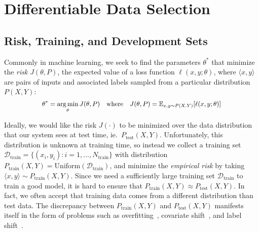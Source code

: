 \section{\label{sec:method} Differentiable Data Selection}

\subsection{\label{sec:dds_motivation}Risk, Training, and Development Sets}

Commonly in machine learning, we seek to find the parameters $\theta^*$ that minimize the \emph{risk} $J(\theta,P)$, the expected value of a loss function $\ell(x, y; \theta)$, where $\langle x, y \rangle$ are pairs of inputs and associated labels sampled from a particular distribution $P(X, Y)$:
\begin{equation}
  \label{eqn:generic_optim}
   \small
  \begin{aligned}
    \theta^* = \argmin_\theta J(\theta, P)
    ~~~\text{where}~~~
    J(\theta, P) = \mathbb{E}_{x, y \sim P(X, Y)} [\ell(x, y; \theta)]
  \end{aligned}
\end{equation}

Ideally, we would like the risk $J(\cdot)$ to be minimized over the data distribution that our system sees at test time, ie.~$P_{\text{test}}(X,Y)$.
Unfortunately, this distribution is unknown at training time, so instead we collect a training set $\mathcal{D}_\text{train} = \{(x_i, y_i): i = 1, ..., N_\text{train}\}$ with distribution $P_\text{train}(X, Y) = \text{Uniform}(\mathcal{D}_\text{train})$, and minimize the \emph{empirical risk} by taking $\langle x, y \rangle \sim P_\text{train}(X, Y)$.
Since we need a sufficiently large training set $\mathcal{D}_\text{train}$ to train a good model, it is hard to ensure that $P_\text{train}(X, Y) \approx P_{\text{test}}(X, Y)$. In fact, we often accept that training data comes from a different distribution than test data.
The discrepancy between $P_\text{train}(X, Y)$ and $P_\text{test}(X, Y)$ manifests itself in the form of problems such as overfitting~\citep{overfit_random_examples,dropout}, covariate shift~\citep{shimodaira2000improving}, and label shift~\citep{lipton2018detecting}.

